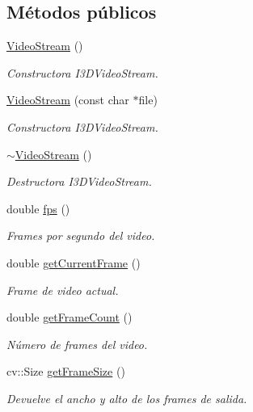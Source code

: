 \subsection*{Métodos públicos}
\begin{DoxyCompactItemize}
\item 
\hyperlink{class_i3_d_1_1_video_stream_a93cc6df0a8514eefcb1bf85a95168f34}{Video\+Stream} ()
\begin{DoxyCompactList}\small\item\em Constructora I3\+D\+Video\+Stream. \end{DoxyCompactList}\item 
\hyperlink{class_i3_d_1_1_video_stream_aaa046c13d80ba4dae903346ac2f512fe}{Video\+Stream} (const char $\ast$file)
\begin{DoxyCompactList}\small\item\em Constructora I3\+D\+Video\+Stream. \end{DoxyCompactList}\item 
\hyperlink{class_i3_d_1_1_video_stream_a3034afe657b7337a8e697b26727b3edd}{$\sim$\+Video\+Stream} ()
\begin{DoxyCompactList}\small\item\em Destructora I3\+D\+Video\+Stream. \end{DoxyCompactList}\item 
double \hyperlink{class_i3_d_1_1_video_stream_ae9911a61f3c3196ad7efcb49cd3a9595}{fps} ()
\begin{DoxyCompactList}\small\item\em Frames por segundo del video. \end{DoxyCompactList}\item 
double \hyperlink{class_i3_d_1_1_video_stream_a8deb6c7defcf5bbc01be2ae48c68167e}{get\+Current\+Frame} ()
\begin{DoxyCompactList}\small\item\em Frame de video actual. \end{DoxyCompactList}\item 
double \hyperlink{class_i3_d_1_1_video_stream_a2416c9205c1ce815d6692153d162635d}{get\+Frame\+Count} ()
\begin{DoxyCompactList}\small\item\em Número de frames del video. \end{DoxyCompactList}\item 
cv\+::\+Size \hyperlink{class_i3_d_1_1_video_stream_adcd195f78a21b8009b1069643fed5a14}{get\+Frame\+Size} ()
\begin{DoxyCompactList}\small\item\em Devuelve el ancho y alto de los frames de salida. \end{DoxyCompactList}\item 

\end{DoxyCompactItemize}

